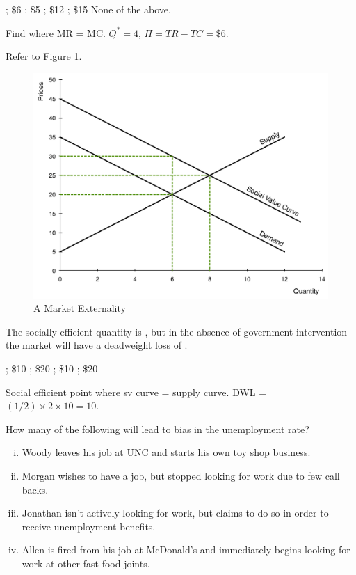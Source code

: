 \documentclass[addpoints,11pt]{exam}
\theoremstyle{definition}
\newcommand{\blank}[0]{\underline{\hspace{3cm}}}
\begin{document}
\begin{questions}
\begin{choices}
; \$6
; \$5
; \$12
; \$15
\choice None of the above.
\end{choices}

\begin{solution}
Find where MR = MC. $Q^* = 4$, $\Pi = TR - TC = \$6$.
\end{solution}

\question Refer to Figure \ref{fig4}.

\begin{figure}[h!]
	\centering
	\includegraphics[scale=.40]{Exam_Review5.pdf}
	\caption{A Market Externality}
	\label{fig4}
\end{figure}

The socially efficient quantity is \blank, but in the absence of government intervention the market will have a deadweight loss of \blank.

\begin{choices}
; \$10
; \$20
; \$10
; \$20
\end{choices}

\begin{solution}
Social efficient point where sv curve = supply curve. DWL = $(1/2)\times 2\times 10 = 10$.
\end{solution}

\newpage

\question How many of the following will lead to bias in the unemployment rate?

\begin{enumerate}[i.]
	\item Woody leaves his job at UNC and starts his own toy shop business.
	\item Morgan wishes to have a job, but stopped looking for work due to few call backs.
	\item Jonathan isn't actively looking for work, but claims to do so in order to receive unemployment benefits.
	\item Allen is fired from his job at McDonald's and immediately begins looking for work at other fast food joints.
\end{enumerate}


\end{questions}
\end{document}
